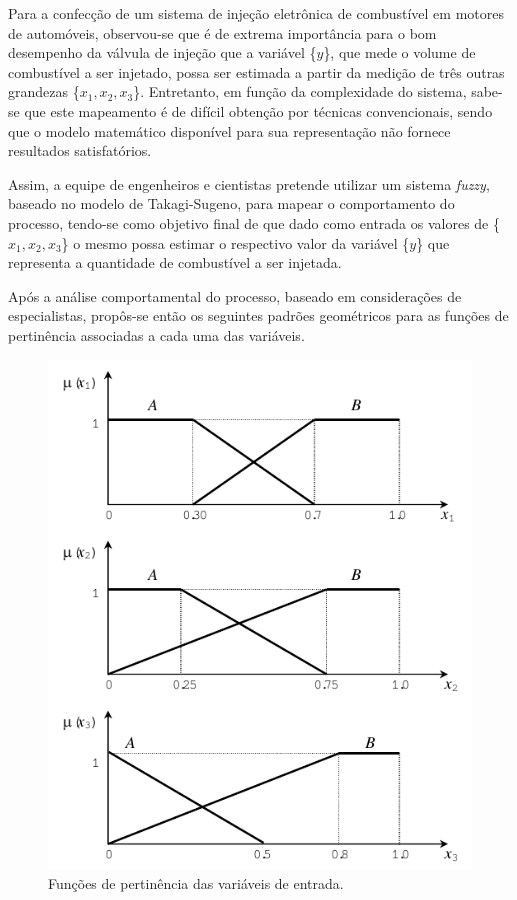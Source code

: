 \documentclass{report}
\begin{document}
\newpage

Para a confecção de um sistema de injeção eletrônica de combustível em motores de
automóveis, observou-se que é de extrema importância para o bom desempenho da válvula de
injeção que a variável \{$y$\}, que mede o volume de combustível a ser injetado, possa ser estimada
a partir da medição de três outras grandezas \{$x_1, x_2, x_3$\}. Entretanto, em função da complexidade
do sistema, sabe-se que este mapeamento é de difícil obtenção por técnicas convencionais, sendo
que o modelo matemático disponível para sua representação não fornece resultados satisfatórios.

Assim, a equipe de engenheiros e cientistas pretende utilizar um sistema \emph{fuzzy}, baseado
no modelo de Takagi-Sugeno, para mapear o comportamento do processo, tendo-se como
objetivo final de que dado como entrada os valores de \{$x_1, x_2, x_3$\} o mesmo possa estimar o
respectivo valor da variável \{$y$\} que representa a quantidade de combustível a ser injetada.

Após a análise comportamental do processo, baseado em considerações de especialistas,
propôs-se então os seguintes padrões geométricos para as funções de pertinência associadas a
cada uma das variáveis.

\begin{figure}[hptb]
\centering
\includegraphics[scale=0.7]{fig.png}
\caption{Funções de pertinência das variáveis de entrada.}
\label{fig:fig1}
\end{figure}
\end{document}

